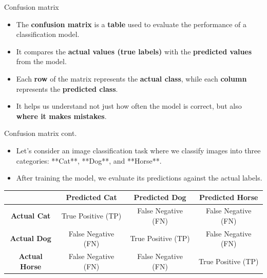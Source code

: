 \documentclass[serif, aspectratio=169]{beamer}
\begin{document}
\begin{frame}{Confusion matrix}
    \begin{itemize}
        \item The \textbf{confusion matrix} is a \textbf{table} used to evaluate the performance of a classification model.
        \item It compares the \textbf{actual values (true labels)} with the \textbf{predicted values} from the model.
        \item Each \textbf{row} of the matrix represents the \textbf{actual class}, while each \textbf{column} represents the \textbf{predicted class}.
        \item It helps us understand not just how often the model is correct, but also \textbf{where it makes mistakes}.
    \end{itemize}
    
\end{frame}


\begin{frame}{Confusion matrix cont.}
    \begin{itemize}
        \item Let's consider an image classification task where we classify images into three categories: **Cat**, **Dog**, and **Horse**.
        \item After training the model, we evaluate its predictions against the actual labels.
    \end{itemize}
    
    \vfill
    \centering
    \begin{tabular}{|c|c|c|c|}
    \hline
    & \textbf{Predicted Cat} & \textbf{Predicted Dog} & \textbf{Predicted Horse} \\
    \hline
    \textbf{Actual Cat} & True Positive (TP) & False Negative (FN) & False Negative (FN) \\
    \hline
    \textbf{Actual Dog} & False Negative (FN) & True Positive (TP) & False Negative (FN) \\
    \hline
    \textbf{Actual Horse} & False Negative (FN) & False Negative (FN) & True Positive (TP) \\
    \hline
    \end{tabular}
\end{frame}
\end{document}
